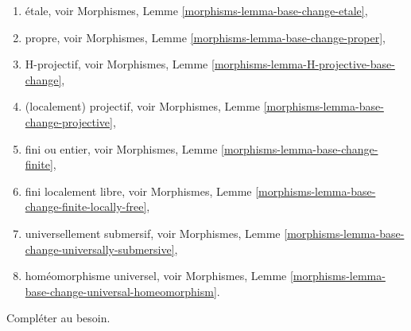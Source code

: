 \begin{remark}
\begin{enumerate}
Morphismes, Lemme \ref{morphisms-lemma-base-change-unramified},
\item \'etale, voir
Morphismes, Lemme \ref{morphisms-lemma-base-change-etale},
\item propre, voir
Morphismes, Lemme \ref{morphisms-lemma-base-change-proper},
\item H-projectif, voir
Morphismes, Lemme \ref{morphisms-lemma-H-projective-base-change},
\item (localement) projectif, voir
Morphismes, Lemme \ref{morphisms-lemma-base-change-projective},
\item fini ou entier, voir
Morphismes, Lemme \ref{morphisms-lemma-base-change-finite},
\item fini localement libre, voir
Morphismes, Lemme \ref{morphisms-lemma-base-change-finite-locally-free},
\item universellement submersif, voir
Morphismes, Lemme \ref{morphisms-lemma-base-change-universally-submersive},
\item homéomorphisme universel, voir
Morphismes, Lemme \ref{morphisms-lemma-base-change-universal-homeomorphism}.
\end{enumerate}
Compléter au besoin.
\end{remark}

